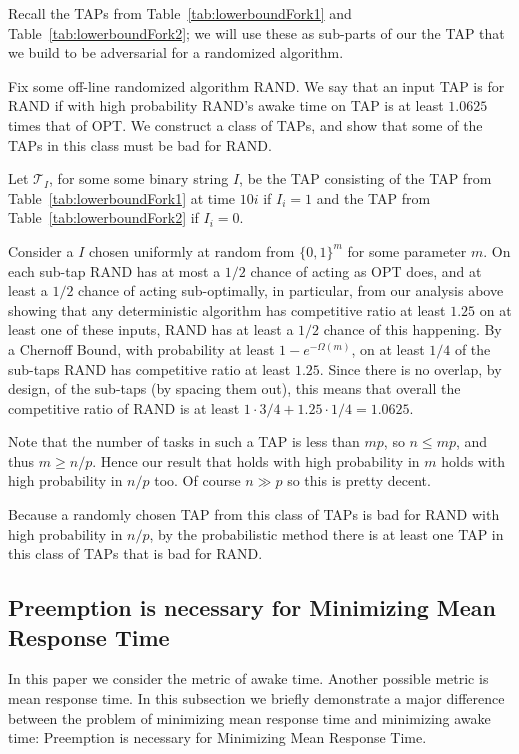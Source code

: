 Recall the TAPs from Table~\ref{tab:lowerboundFork1} and
Table~\ref{tab:lowerboundFork2}; we will use these as sub-parts
of our the TAP that we build to be adversarial for a randomized
algorithm. 

Fix some off-line randomized algorithm RAND. We say that an input
TAP is  for RAND if with high probability RAND's awake
time on TAP is at least $1.0625$ times that of OPT.
We construct a class of TAPs, and show that some of the TAPs in
this class must be bad for RAND.

Let $\mathcal{T}_{I}$, for some some binary string $I$, be the
TAP consisting of the TAP from Table~\ref{tab:lowerboundFork1} at
time $10i$ if $I_i = 1$ and the TAP from
Table~\ref{tab:lowerboundFork2} if $I_i = 0$. 

Consider a $I$ chosen uniformly at random from $\{0,1\}^m$ for
some parameter $m$.
On each sub-tap RAND has at most a $1/2$ chance of acting as OPT
does, and at least a $1/2$ chance of acting sub-optimally, in
particular, from our analysis above showing that any deterministic
algorithm has competitive ratio at least $1.25$ on at least one
of these inputs, RAND has at least a $1/2$ chance of this
happening.
By a Chernoff Bound, with probability at least
$1-e^{-\Omega(m)}$, on at least $1/4$ of the sub-taps RAND has
competitive ratio at least $1.25$. Since there is no overlap, by
design, of the sub-taps (by spacing them out), this means that
overall the competitive ratio of RAND is at least $1\cdot 3/4 +
1.25 \cdot 1/4 = 1.0625.$

Note that the number of tasks in such a TAP is less than $mp$, so
$n \le mp$, and thus $m \ge n/p$.
Hence our result that holds with high probability in $m$ holds
with high probability in $n/p$ too.
Of course $n\gg p$ so this is pretty decent.

Because a randomly chosen TAP from this class of TAPs is bad for
RAND with high probability in $n/p$, by the probabilistic method
there is at least one TAP in this class of TAPs that is bad for
RAND. 

\subsection{Preemption is necessary for Minimizing Mean Response Time}

In this paper we consider the metric of awake time. Another
possible metric is mean response time. In this subsection we
briefly demonstrate a major difference between the problem of
minimizing mean response time and minimizing awake time:
Preemption is necessary for Minimizing Mean Response Time.


